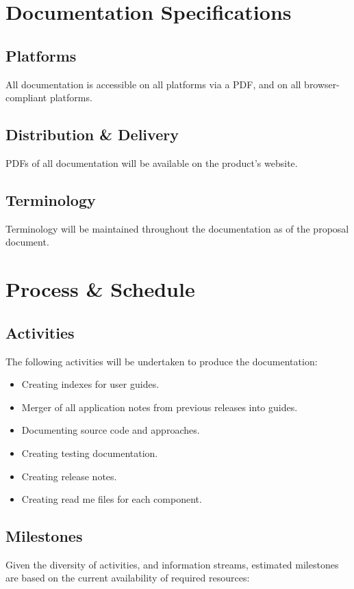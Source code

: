 \section*{Documentation Specifications}
\subsection*{Platforms}
All documentation is accessible on all platforms via a PDF, and on all browser-compliant platforms.

\subsection*{Distribution \& Delivery}
PDFs of all documentation will be available on the product's website.

\subsection*{Terminology}
Terminology will be maintained throughout the documentation as of the proposal document.

\section*{Process \& Schedule}
\subsection*{Activities}
The following activities will be undertaken to produce the documentation:
\begin{itemize}
	\item Creating indexes for user guides.
	\item Merger of all application notes from previous releases into guides.
	\item Documenting source code and approaches.
	\item Creating testing documentation.
	\item Creating release notes.
	\item Creating read me files for each component.
\end{itemize}

\subsection*{Milestones}
Given the diversity of activities, and information streams, estimated milestones are based on the current availability of required resources:

